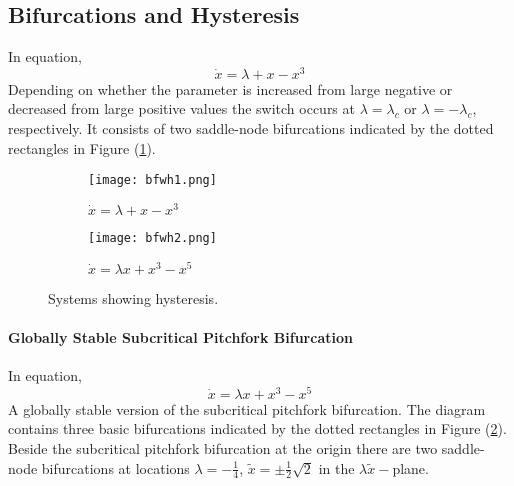 \subsection{Bifurcations and Hysteresis}
In equation, 
\begin{equation}
  \dot{x}=\lambda+x-x^3
\end{equation}
Depending on whether the parameter is increased from large negative or decreased from large positive values the switch occurs at $\lambda=\lambda_c$ or $\lambda=-\lambda_c$, respectively.
It consists of two saddle-node bifurcations indicated by the dotted rectangles in Figure (\ref{fig:bfwh1}).
\begin{figure}[h!]
  \centering
  \begin{subfigure}{0.45\linewidth}
    \raggedleft
    \texttt{[image: bfwh1.png]}
    \caption{$\dot{x}=\lambda+x-x^3$}
    \label{fig:bfwh1}
  \end{subfigure}
  \vline
  \begin{subfigure}{0.45\linewidth}
    \raggedright
    \texttt{[image: bfwh2.png]}
    \caption{$\dot{x}=\lambda x+x^3-x^5$}
    \label{fig:bfwh2}
  \end{subfigure}
  \caption{Systems showing hysteresis.}
  \label{fig:bfwh}
\end{figure}
\paragraph{Globally Stable Subcritical Pitchfork Bifurcation}
In equation, 
\begin{equation}
\dot{x}=\lambda x+x^3-x^5
\end{equation}
A globally stable version of the subcritical pitchfork bifurcation.
The diagram contains three basic bifurcations indicated by the dotted rectangles in Figure (\ref{fig:bfwh2}).
Beside the subcritical pitchfork bifurcation at the origin there are two saddle-node bifurcations at locations $\lambda=-\frac{1}{4}$, $\tilde{x}=\pm\frac{1}{2}\sqrt{2 }$ in the $\lambda\tilde{x}-$plane.